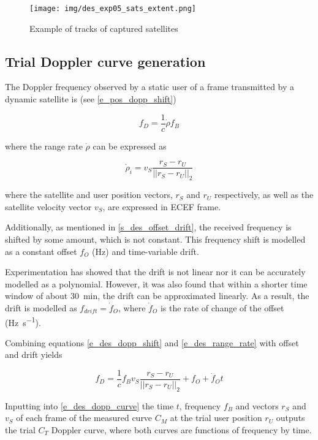 \begin{figure}
    \centering
    \texttt{[image: img/des\_exp05\_sats\_extent.png]}
    \caption{Example of tracks of captured satellites}
    \label{f_des_exp05_sats_extent}
\end{figure}


\subsection{Trial Doppler curve generation}
The Doppler frequency observed by a static user of a frame transmitted by a dynamic satellite  is (see \autoref{e_pos_dopp_shift})

\begin{equation}
    \label{e_des_dopp_shift}
    f_D = \frac{1}{c}\dot\rho f_B
\end{equation}

where the range rate $\dot\rho$ can be expressed as

\begin{equation}
    \label{e_des_range_rate}
    \dot\rho_i = v_S \frac{r_S - r_U}{||r_S - r_U||_2}
\end{equation}

where the satellite and user position vectors, $r_S$ and $r_U$ respectively, as well as the satellite velocity vector $v_S$, are expressed in ECEF frame.

Additionally, as mentioned in \autoref{s_des_offset_drift}, the received frequency is shifted by some amount, which is not constant. This frequency shift is modelled as a constant offset $f_O$ (Hz) and time-variable drift.

Experimentation has showed that the drift is not linear nor it can be accurately modelled as a polynomial. However, it was also found that within a shorter time window of about \qty{30}{min},
the drift can be approximated linearly. As a result, the drift is modelled as $f_{drift} = \dot f_O$, where $\dot f_O$ is the rate of change of the offset (\unit{\hertz\per\s}).

Combining equations \ref{e_des_dopp_shift} and \ref{e_des_range_rate} with offset and drift yields


\begin{equation}
    \label{e_des_dopp_curve}
    f_D = \frac{1}{c} f_B v_S \frac{r_S - r_U}{||r_S - r_U||_2} + f_O + \dot f_O t
\end{equation}

Inputting into \autoref{e_des_dopp_curve} the time $t$, frequency $f_B$ and vectors $r_S$ and $v_S$ of each frame of the measured curve $C_M$ at the trial user position $r_U$ outputs the trial $C_T$ Doppler curve, where both curves are functions of frequency by time.  %


